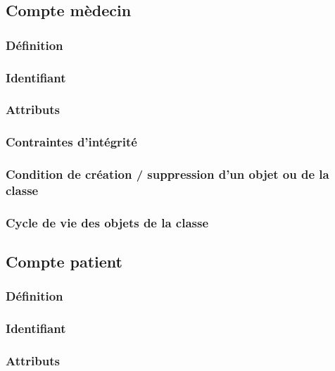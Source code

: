 \documentclass[a4paper, 11pt]{report}
\begin{document}
\subsection{Compte mèdecin}

\subsubsection{Définition}

\subsubsection{Identifiant}

\subsubsection{Attributs}

\subsubsection{Contraintes d'intégrité}

\subsubsection{Condition de création / suppression d'un objet ou de la classe}

\subsubsection{Cycle de vie des objets de la classe}

\subsection{Compte patient}

\subsubsection{Définition}

\subsubsection{Identifiant}

\subsubsection{Attributs}
\end{document}

